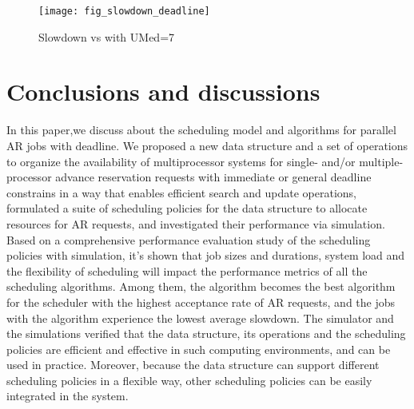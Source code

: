 \documentclass[preprint,12pt]{elsarticle}
\begin{document}
\begin{figure}[htp]
\centering
\texttt{[image: fig\_slowdown\_deadline]}
\caption{Slowdown vs  with UMed=7}
\label{fig:slowdown3}
\end{figure}



\section{Conclusions and discussions}
\label{conclusion}

In this paper,we discuss about the scheduling model and algorithms for parallel AR jobs with deadline. We proposed a new data structure and a set of operations to organize the availability of multiprocessor systems for single- and/or multiple-processor advance reservation requests with immediate or general deadline constrains in a way that enables efficient search and update operations, formulated a suite of scheduling policies for the data structure to allocate resources for AR requests, and investigated their performance via simulation.
Based on a comprehensive performance evaluation study of the scheduling policies with simulation, it's shown that job sizes and durations, system load and the flexibility of scheduling will impact the performance metrics of all the scheduling algorithms. Among them, the  algorithm becomes the best algorithm for the scheduler with the highest acceptance rate of AR requests, and the jobs with the  algorithm experience the lowest average slowdown. The simulator and the simulations verified that the data structure, its operations and the scheduling policies are efficient and effective in such computing environments, and can be used in practice. Moreover, because the data structure can support different scheduling policies in a flexible way, other scheduling policies can be easily integrated in the system.
\end{document}
